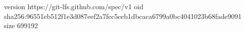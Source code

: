 version https://git-lfs.github.com/spec/v1
oid sha256:96551eb512f1e3d087eef2a7fcc5ceb1dbcaca6799a0bc4041023b68fade9091
size 699192
